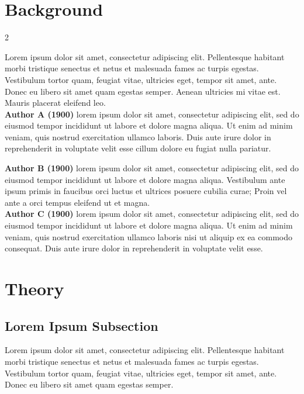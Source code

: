 \documentclass[a4paper,11pt]{article}
\begin{document}
\section{Background}
\begin{multicols}{2}
\raggedright
Lorem ipsum dolor sit amet, consectetur adipiscing elit. Pellentesque habitant morbi tristique senectus et netus et malesuada fames ac turpis egestas. Vestibulum tortor quam, feugiat vitae, ultricies eget, tempor sit amet, ante. Donec eu libero sit amet quam egestas semper. Aenean ultricies mi vitae est. Mauris placerat eleifend leo. \newline \\ \textbf{Author A (1900)} lorem ipsum dolor sit amet, consectetur adipiscing elit, sed do eiusmod tempor incididunt ut labore et dolore magna aliqua. Ut enim ad minim veniam, quis nostrud exercitation ullamco laboris. Duis aute irure dolor in reprehenderit in voluptate velit esse cillum dolore eu fugiat nulla pariatur.

\textbf{Author B (1900)} lorem ipsum dolor sit amet, consectetur adipiscing elit, sed do eiusmod tempor incididunt ut labore et dolore magna aliqua. Vestibulum ante ipsum primis in faucibus orci luctus et ultrices posuere cubilia curae; Proin vel ante a orci tempus eleifend ut et magna. \newline \\ \textbf{Author C (1900)} lorem ipsum dolor sit amet, consectetur adipiscing elit, sed do eiusmod tempor incididunt ut labore et dolore magna aliqua. Ut enim ad minim veniam, quis nostrud exercitation ullamco laboris nisi ut aliquip ex ea commodo consequat. Duis aute irure dolor in reprehenderit in voluptate velit esse.
\end{multicols}

\section{Theory}

\subsection{Lorem Ipsum Subsection}

Lorem ipsum dolor sit amet, consectetur adipiscing elit. Pellentesque habitant morbi tristique senectus et netus et malesuada fames ac turpis egestas. Vestibulum tortor quam, feugiat vitae, ultricies eget, tempor sit amet, ante. Donec eu libero sit amet quam egestas semper.
\end{document}
